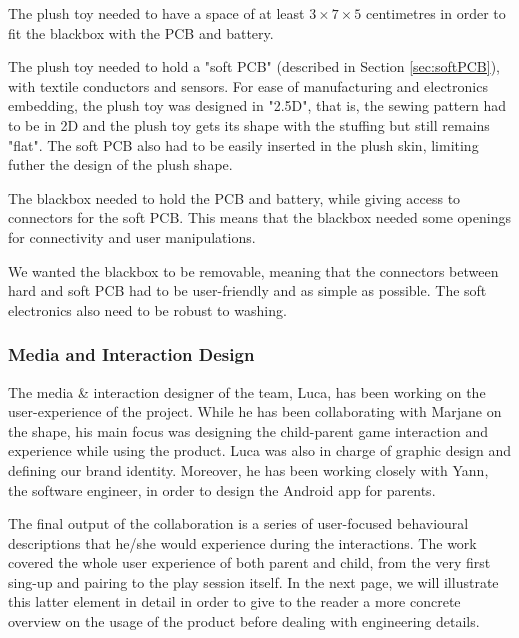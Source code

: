 \begin{description} [align=left]
    \item [Size of the main body] The plush toy needed to have a space of at least $3\times7\times5$ centimetres in order to fit the blackbox with the PCB and battery.
    \item[Shape of the plush toy] The plush toy needed to hold a "soft PCB" (described in Section \ref{sec:softPCB}), with textile conductors and sensors. For ease of manufacturing and electronics embedding, the plush toy was designed in "2.5D", that is, the sewing pattern had to be in 2D and the plush toy gets its shape with the stuffing but still remains "flat". The soft PCB also had to be easily inserted in the plush skin, limiting futher the design of the plush shape.
    \item[Blackbox] The blackbox needed to hold the PCB and battery, while giving access to connectors for the soft PCB. This means that the blackbox needed some openings for connectivity and user manipulations.
    \item[Washability] We wanted the blackbox to be removable, meaning that the connectors between hard and soft PCB had to be user-friendly and as simple as possible. The soft electronics also need to be robust to washing.
\end{description}

\subsubsection{Media and Interaction Design}
\label{sec:interaction_design}

The media \& interaction designer of the team, Luca, has been working on the user-experience of the project. While he has been collaborating with Marjane on the shape, his main focus was designing the child-parent game interaction and experience while using the product. Luca was also in charge of graphic design and defining our brand identity. Moreover, he has been working closely with Yann, the software engineer, in order to design the Android app for parents.

\medskip
The final output of the collaboration is a series of user-focused behavioural descriptions that he/she would experience during the interactions. The work covered the whole user experience of both parent and child, from the very first sing-up and pairing to the play session itself. In the next page, we will illustrate this latter element in detail in order to give to the reader a more concrete overview on the usage of the product before dealing with engineering details.

